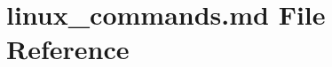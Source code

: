 \hypertarget{linux__commands_8md}{}\section{linux\+\_\+commands.\+md File Reference}
\label{linux__commands_8md}
